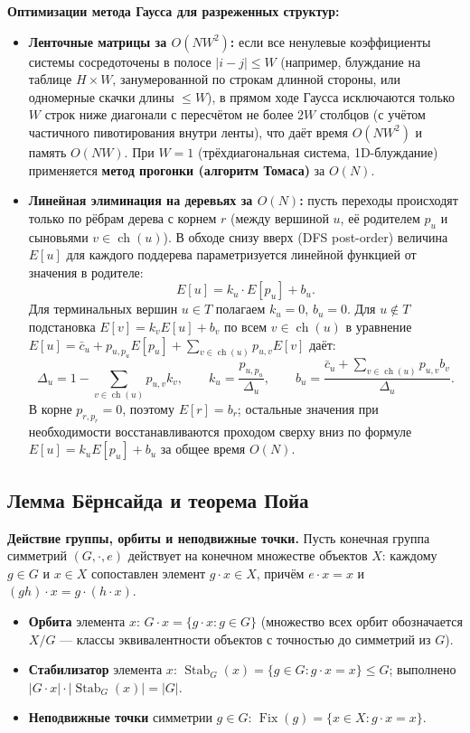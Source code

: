 \documentclass[10pt,a4paper]{article}
\renewcommand{\le}{\leqslant}
\DeclareMathOperator{\Fix}{Fix}
\DeclareMathOperator{\Stab}{Stab}
\begin{document}
\textbf{Оптимизации метода Гаусса для разреженных структур:}
\begin{itemize}
  \item \textbf{Ленточные матрицы за $O(N W^2)$:} если все ненулевые коэффициенты системы сосредоточены в полосе $|i - j| \le W$ (например, блуждание на таблице $H \times W$, занумерованной по строкам длинной стороны, или одномерные скачки длины $\le W$), в прямом ходе Гаусса исключаются только $W$ строк ниже диагонали с пересчётом не более $2W$ столбцов (с учётом частичного пивотирования внутри ленты), что даёт время $O(N W^2)$ и память $O(N W)$. При $W = 1$ (трёхдиагональная система, 1D-блуждание) применяется \textbf{метод прогонки (алгоритм Томаса)} за $O(N)$.
  \item \textbf{Линейная элиминация на деревьях за $O(N)$:} пусть переходы происходят только по рёбрам дерева с корнем $r$ (между вершиной $u$, её родителем $p_u$ и сыновьями $v \in \operatorname{ch}(u)$). В обходе снизу вверх (DFS post-order) величина $E[u]$ для каждого поддерева параметризуется линейной функцией от значения в родителе:
  \[
    E[u] = k_u \cdot E[p_u] + b_u.
  \]
  Для терминальных вершин $u \in T$ полагаем $k_u = 0$, $b_u = 0$. Для $u \notin T$ подстановка $E[v] = k_v E[u] + b_v$ по всем $v \in \operatorname{ch}(u)$ в уравнение $E[u] = \bar{c}_u + p_{u, p_u} E[p_u] + \sum_{v \in \operatorname{ch}(u)} p_{u,v} E[v]$ даёт:
  \[
    \Delta_u = 1 - \sum_{v \in \operatorname{ch}(u)} p_{u,v} k_v, \qquad
    k_u = \frac{p_{u, p_u}}{\Delta_u}, \qquad
    b_u = \frac{\bar{c}_u + \sum_{v \in \operatorname{ch}(u)} p_{u,v} b_v}{\Delta_u}.
  \]
  В корне $p_{r, p_r} = 0$, поэтому $E[r] = b_r$; остальные значения при необходимости восстанавливаются проходом сверху вниз по формуле $E[u] = k_u E[p_u] + b_u$ за общее время $O(N)$.
\end{itemize}

\subsection{Лемма Бёрнсайда и теорема Пойа}

\textbf{Действие группы, орбиты и неподвижные точки.} Пусть конечная группа симметрий $(G, \cdot, e)$ действует на конечном множестве объектов $X$: каждому $g \in G$ и $x \in X$ сопоставлен элемент $g \cdot x \in X$, причём $e \cdot x = x$ и $(gh) \cdot x = g \cdot (h \cdot x)$.
\begin{itemize}
  \item \textbf{Орбита} элемента $x$: $G \cdot x = \{g \cdot x : g \in G\}$ (множество всех орбит обозначается $X / G$ — классы эквивалентности объектов с точностью до симметрий из $G$).
  \item \textbf{Стабилизатор} элемента $x$: $\Stab_G(x) = \{g \in G : g \cdot x = x\} \le G$; выполнено $|G \cdot x| \cdot |\Stab_G(x)| = |G|$.
  \item \textbf{Неподвижные точки} симметрии $g \in G$: $\Fix(g) = \{x \in X : g \cdot x = x\}$.
\end{itemize}
\end{document}
